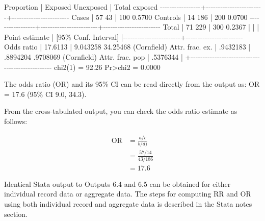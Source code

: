 \documentclass[
]{memoir}
\newenvironment{Shaded}{\begin{snugshade}}{\end{snugshade}}
\newcommand{\NormalTok}[1]{#1}
\begin{document}
\begin{Shaded}
\begin{Highlighting}[]
\NormalTok{                                                         Proportion}
\NormalTok{                 |   Exposed   Unexposed  |      Total      exposed}
\NormalTok{{-}{-}{-}{-}{-}{-}{-}{-}{-}{-}{-}{-}{-}{-}{-}{-}{-}+{-}{-}{-}{-}{-}{-}{-}{-}{-}{-}{-}{-}{-}{-}{-}{-}{-}{-}{-}{-}{-}{-}{-}{-}+{-}{-}{-}{-}{-}{-}{-}{-}{-}{-}{-}{-}{-}{-}{-}{-}{-}{-}{-}{-}{-}{-}{-}{-}}
\NormalTok{           Cases |        57          43  |        100       0.5700}
\NormalTok{        Controls |        14         186  |        200       0.0700}
\NormalTok{{-}{-}{-}{-}{-}{-}{-}{-}{-}{-}{-}{-}{-}{-}{-}{-}{-}+{-}{-}{-}{-}{-}{-}{-}{-}{-}{-}{-}{-}{-}{-}{-}{-}{-}{-}{-}{-}{-}{-}{-}{-}+{-}{-}{-}{-}{-}{-}{-}{-}{-}{-}{-}{-}{-}{-}{-}{-}{-}{-}{-}{-}{-}{-}{-}{-}}
\NormalTok{           Total |        71         229  |        300       0.2367}
\NormalTok{                 |                        |}
\NormalTok{                 |      Point estimate    |    [95\% Conf. Interval]}
\NormalTok{                 |{-}{-}{-}{-}{-}{-}{-}{-}{-}{-}{-}{-}{-}{-}{-}{-}{-}{-}{-}{-}{-}{-}{-}{-}+{-}{-}{-}{-}{-}{-}{-}{-}{-}{-}{-}{-}{-}{-}{-}{-}{-}{-}{-}{-}{-}{-}{-}{-}}
\NormalTok{      Odds ratio |          17.6113       |    9.043258    34.25468 (Cornfield)}
\NormalTok{ Attr. frac. ex. |         .9432183       |    .8894204    .9708069 (Cornfield)}
\NormalTok{ Attr. frac. pop |         .5376344       |}
\NormalTok{                 +{-}{-}{-}{-}{-}{-}{-}{-}{-}{-}{-}{-}{-}{-}{-}{-}{-}{-}{-}{-}{-}{-}{-}{-}{-}{-}{-}{-}{-}{-}{-}{-}{-}{-}{-}{-}{-}{-}{-}{-}{-}{-}{-}{-}{-}{-}{-}{-}{-}}
\NormalTok{                               chi2(1) =    92.26  Pr\textgreater{}chi2 = 0.0000}
\end{Highlighting}
\end{Shaded}

The odds ratio (OR) and its 95\% CI can be read directly from the output as: OR = 17.6 (95\% CI 9.0, 34.3).

From the cross-tabulated output, you can check the odds ratio estimate as follows:

\[
\begin{aligned}
\text{OR} &= \frac{a / c}{b /d)} \\
  &= \frac{57 / 14}{43 / 186} \\
  &= 17.6
\end{aligned}
\]

Identical Stata output to Outputs 6.4 and 6.5 can be obtained for either individual record data or aggregate data. The steps for computing RR and OR using both individual record and aggregate data is described in the Stata notes section.
\end{document}
